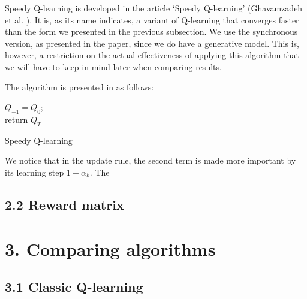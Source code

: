\documentclass[a4paper, 12pt]{report}
\begin{document}
Speedy Q-learning is developed in the article `Speedy Q-learning' (Ghavamzadeh et al. \cite{ghavamzadeh2011speedy}).
It is, as its name indicates, a variant of Q-learning that converges faster than the form we presented in the previous subsection.
We use the synchronous version, as presented in the paper, since we do have a generative model.
This is, however, a restriction on the actual effectiveness of applying this algorithm that we will have to keep in mind later when comparing results.

The algorithm is presented in \cite{ghavamzadeh2011speedy} as follows:

\begin{algorithm}[H]
  $Q_{-1} = Q_0$;\\
  return $Q_T$
\caption{Speedy Q-learning}
\end{algorithm}

We notice that in the update rule, the second term is made more important by its learning step $1 - \alpha_k$.
The 

\section*{2.2 Reward matrix}

\chapter*{3. Comparing algorithms}

\section*{3.1 Classic Q-learning}
\end{document}
